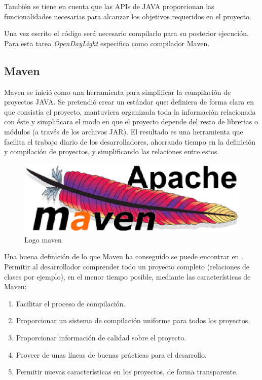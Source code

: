 \documentclass[a4paper,11pt]{book}
\begin{document}
También se tiene en cuenta que las \ac{API}s de JAVA proporcionan las funcionalidades necesarias para alcanzar los objetivos requeridos en el proyecto. 

Una vez escrito el código será necesario compilarlo para su posterior ejecución. Para esta tarea \emph{OpenDayLight} especifica como compilador Maven.

\subsection{Maven}
Maven \cite{maven} se inició como una herramienta para simplificar la compilación de proyectos JAVA. Se pretendió crear un estándar que: definiera de forma clara en que consistía el proyecto, mantuviera organizada toda la información relacionada con éste y simplificara el modo en que el proyecto depende del resto de librerias o módulos (a través de los archivos \ac{JAR}). El resultado es una herramienta que facilita el trabajo diario de los desarrolladores, ahorrando tiempo en la definición y compilación de proyectos, y simplificando las relaciones entre estos.

\begin{figure}[tb]
\centering
\includegraphics[scale=0.8]{./figuras/maven}
\caption{Logo maven}\label{logoMaven}
\end{figure}

Una buena definición de lo que Maven ha conseguido se puede encontrar en \cite{maven}. Permitir al desarrollador comprender todo un proyecto completo (relaciones de clases por ejemplo), en el menor tiempo posible, mediante las características de Maven:

\begin{enumerate}
\item Facilitar el proceso de compilación.
\item Proporcionar un sistema de compilación uniforme para todos los proyectos.
\item Proporcionar información de calidad sobre el proyecto.
\item Proveer de unas líneas de buenas prácticas para el desarrollo.
\item Permitir nuevas características en los proyectos, de forma transparente.
\end{enumerate}
\end{document}
